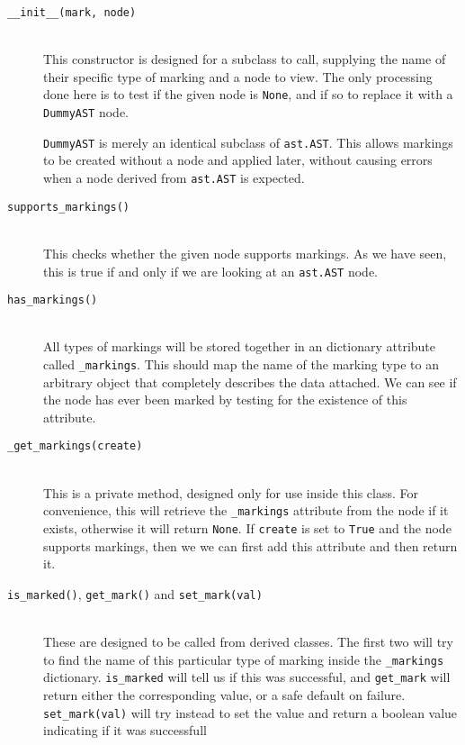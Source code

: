 \documentclass[twoside,a4paper]{report}
\begin{document}
\begin{description}
\item[\texttt{\_\_init\_\_(mark, node)}] \hfill \\
This constructor is designed for a subclass to call, supplying the name of their specific type of marking and a node to view. The only
processing done here is to test if the given node is \texttt{None}, and if so to replace it with a \texttt{DummyAST} node.

\texttt{DummyAST} is merely an identical subclass of \texttt{ast.AST}. This allows markings to be created without a node and applied later,
without causing errors when a node derived from \texttt{ast.AST} is expected.

\item[\texttt{supports\_markings()}] \hfill \\
This checks whether the given node supports markings. As we have seen, this is true if and only if we are looking at an \texttt{ast.AST}
node.

\item[\texttt{has\_markings()}] \hfill \\
All types of markings will be stored together in an dictionary attribute called \texttt{\_markings}. This should map the name of the marking
type to an arbitrary object that completely describes the data attached. We can see if the node has ever been marked by testing for the
existence of this attribute.

\item[\texttt{\_get\_markings(create)}] \hfill \\
This is a private method, designed only for use inside this class. For convenience, this will retrieve the \texttt{\_markings} attribute
from the node if it exists, otherwise it will return \texttt{None}. If \texttt{create} is set to \texttt{True} and the node supports
markings, then we we can first add this attribute and then return it.

\item[\texttt{is\_marked()}, \texttt{get\_mark()} and \texttt{set\_mark(val)}] \hfill \\
These are designed to be called from derived classes. The first two will try to find the name of this particular type of marking inside
the \texttt{\_markings} dictionary. \texttt{is\_marked} will tell us if this was successful, and \texttt{get\_mark} will return either the
corresponding value, or a safe default on failure. \texttt{set\_mark(val)} will try instead to set the value and return a boolean value
indicating if it was successfull


\end{description}
\end{document}
